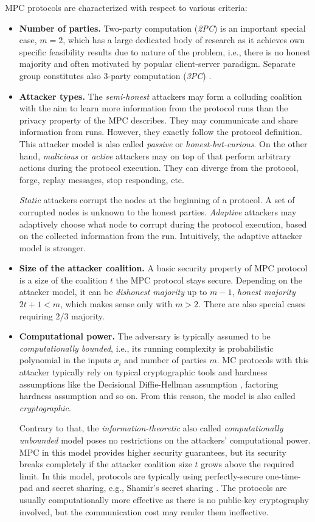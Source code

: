 \documentclass[
  digital, %
  twoside, %
  table,   %
  lof,     %
  lot,     %
]{fithesis3}
\newcommand{\itembf}[1]{\item {\bf{#1}}}
\theoremstyle{definition}
\theoremstyle{remark}
\begin{document}
MPC protocols are characterized with respect to various criteria:
\begin{itemize}
    \itembf{Number of parties.} Two-party computation (\emph{2PC}) is an important special case, $m=2$, which has a large dedicated body of research as it achieves own specific feasibility results due to nature of the problem, i.e., there is no honest majority and often motivated by popular client-server paradigm. Separate group constitutes also 3-party computation (\emph{3PC}) \cite{CKMZ14, MRZ15}.

    \itembf{Attacker types.} The \emph{semi-honest} attackers may form a colluding coalition with the aim to learn more information from the protocol runs than the privacy property of the MPC describes. They may communicate and share information from runs. However, they exactly follow the protocol definition. This attacker model is also called \emph{passive} or \emph{honest-but-curious}. 
    On the other hand, \emph{malicious} or \emph{active} attackers may on top of that perform arbitrary actions during the protocol execution. They can diverge from the protocol, forge, replay messages, stop responding, etc.

    \emph{Static} attackers corrupt the nodes at the beginning of a protocol. A set of corrupted nodes is unknown to the honest parties. \emph{Adaptive} attackers may adaptively choose what node to corrupt during the protocol execution, based on the collected information from the run. Intuitively, the adaptive attacker model is stronger.
    
    \itembf{Size of the attacker coalition.} A basic security property of MPC protocol is a size of the coalition $t$ the MPC protocol stays secure. Depending on the attacker model, it can be \emph{dishonest majority} up to $m-1$, \emph{honest majority} $2t+1 < m$, which makes sense only with $m>2$. There are also special cases requiring $2/3$ majority.

    \itembf{Computational power.} The adversary is typically assumed to be \emph{computationally bounded}, i.e., its running complexity is probabilistic polynomial in the inputs $x_i$ and number of parties $m$.
    MC protocols with this attacker typically rely on typical cryptographic tools and hardness assumptions like the Decisional Diffie-Hellman assumption \cite{KL07}, factoring hardness assumption and so on. From this reason, the model is also called \emph{cryptographic}.
    
    Contrary to that, the \emph{information-theoretic} also called \emph{computationally unbounded} model poses no restrictions on the attackers' computational power. MPC in this model provides higher security guarantees, but its security breaks completely if the attacker coalition size $t$ grows above the required limit. 
    In this model, protocols are typically using perfectly-secure one-time-pad and secret sharing, e.g., Shamir's secret sharing \cite{Shamir79}. The protocols are usually computationally more effective as there is no public-key cryptography involved, but the communication cost may render them ineffective. 
    

\end{itemize}
\end{document}
